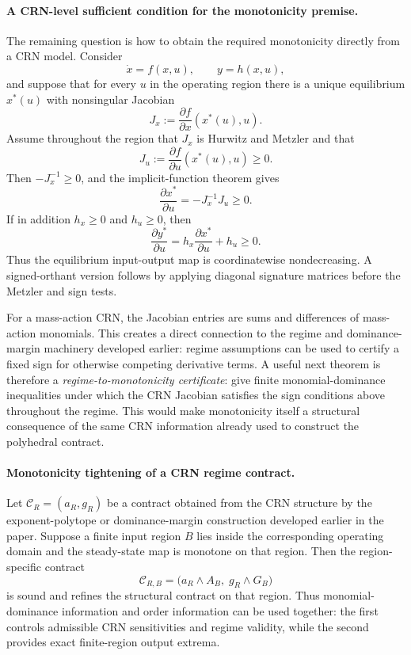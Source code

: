 \paragraph{A CRN-level sufficient condition for the monotonicity premise.}
The remaining question is how to obtain the required monotonicity directly
from a CRN model. Consider
\[
\dot x=f(x,u),\qquad y=h(x,u),
\]
and suppose that for every $u$ in the operating region there is a unique
equilibrium $x^*(u)$ with nonsingular Jacobian
\[
J_x:=\frac{\partial f}{\partial x}(x^*(u),u).
\]
Assume throughout the region that $J_x$ is Hurwitz and Metzler and that
\[
J_u:=\frac{\partial f}{\partial u}(x^*(u),u)\ge0.
\]
Then $-J_x^{-1}\ge0$, and the implicit-function theorem gives
\[
\frac{\partial x^*}{\partial u}
=
-J_x^{-1}J_u
\ge0.
\]
If in addition $h_x\ge0$ and $h_u\ge0$, then
\[
\frac{\partial y^*}{\partial u}
=
h_x\frac{\partial x^*}{\partial u}+h_u
\ge0.
\]
Thus the equilibrium input-output map is coordinatewise nondecreasing.
A signed-orthant version follows by applying diagonal signature matrices before
the Metzler and sign tests.

For a mass-action CRN, the Jacobian entries are sums and differences of
mass-action monomials. This creates a direct connection to the regime and
dominance-margin machinery developed earlier: regime assumptions can be used
to certify a fixed sign for otherwise competing derivative terms. A useful
next theorem is therefore a \emph{regime-to-monotonicity certificate}: give
finite monomial-dominance inequalities under which the CRN Jacobian satisfies
the sign conditions above throughout the regime. This would make monotonicity
itself a structural consequence of the same CRN information already used to
construct the polyhedral contract.

\paragraph{Monotonicity tightening of a CRN regime contract.}
Let $\mathcal C_R=(a_R,g_R)$ be a contract obtained from the CRN structure by
the exponent-polytope or dominance-margin construction developed earlier in
the paper. Suppose a finite input region $B$ lies inside the corresponding
operating domain and the steady-state map is monotone on that region. Then the
region-specific contract
\[
\mathcal C_{R,B}
=
\bigl(a_R\wedge A_B,\; g_R\wedge G_B\bigr)
\]
is sound and refines the structural contract on that region. Thus
monomial-dominance information and order information can be used together:
the first controls admissible CRN sensitivities and regime validity, while the
second provides exact finite-region output extrema.

